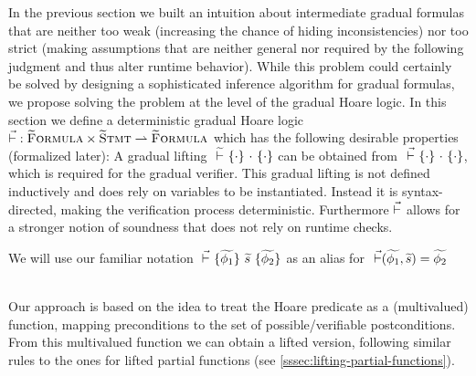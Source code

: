 %
%
%
%

In the previous section we built an intuition about intermediate gradual formulas that are neither too weak (increasing the chance of hiding inconsistencies) nor too strict (making assumptions that are neither general nor required by the following judgment and thus alter runtime behavior).
While this problem could certainly be solved by designing a sophisticated inference algorithm for gradual formulas, we propose solving the problem at the level of the gradual Hoare logic.
In this section we define a deterministic gradual Hoare logic $\vec{\vdash} : \textup{\textsc{\ensuremath{\widetilde{\text{F}}}ormula}} \times \textup{\textsc{\ensuremath{\widetilde{\text{S}}}tmt}} \rightharpoonup \textup{\textsc{\ensuremath{\widetilde{\text{F}}}ormula}}$ which has the following desirable properties (formalized later):
A gradual lifting ${} \,\,\widetilde{\vdash}\,\, \{{\cdot}\} ~{\cdot}~ \{{\cdot}\}$ can be obtained from ${} \,\,\vec{\vdash}\,\, \{{\cdot}\} ~{\cdot}~ \{{\cdot}\}$, which is required for the gradual verifier.
This gradual lifting is not defined inductively and does rely on variables to be instantiated.
Instead it is syntax-directed, making the verification process deterministic.
Furthermore $\vec{\vdash}$ allows for a stronger notion of soundness that does not rely on runtime checks.

We will use our familiar notation ${} \,\,\vec{\vdash}\,\, \{{\widetilde{\phi_1}}\} ~{\widetilde{s}}~ \{{\widetilde{\phi_2}}\}$ as an alias for $~\vec{\vdash}(\widetilde{\phi_1}, \widetilde{s}) = \widetilde{\phi_2}$

~\\
Our approach is based on the idea to treat the Hoare predicate as a (multivalued) function, mapping preconditions to the set of possible/verifiable postconditions.
From this multivalued function we can obtain a lifted version, following similar rules to the ones for lifted partial functions (see \ref{sssec:lifting-partial-functions}).

